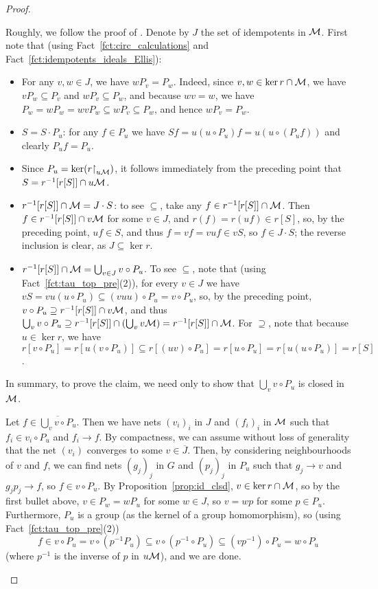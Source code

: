 \begin{proof}
		\begin{clmproof}
			Roughly, we follow the proof of \cite[Lemma 4.8]{KP17}. Denote by $J$ the set of idempotents in ${\mathcal M}$. First note that (using Fact~\ref{fct:circ_calculations} and Fact~\ref{fct:idempotents_ideals_Ellis}):
			\begin{itemize}
				\item
				For any $v,w\in J$, we have $wP_v=P_w$. Indeed, since $v,w\in \ker r\cap {\mathcal M}$, we have $vP_w\subseteq P_v$ and $wP_v\subseteq P_w$, and because $wv=w$, we have $P_w=wP_w=wvP_w\subseteq wP_v\subseteq P_w$, and hence $wP_v=P_w$.
				\item
				$S=S\cdot P_u$: for any $f\in P_u$ we have $Sf=u(u\circ P_u) f=u(u\circ (P_uf))$ and clearly $P_uf=P_u$.
				\item
				Since $P_u=\ker (r\mathord{\upharpoonright}_{u{\mathcal M}})$, it follows immediately from the preceding point that $S=r^{-1}[r[S]]\cap u{\mathcal M}$.
				\item
				$r^{-1}[r[S]]\cap {\mathcal M}=J\cdot S$: to see $\subseteq$, take any $f\in r^{-1}[r[S]]\cap {\mathcal M}$. Then $f\in r^{-1}[r[S]]\cap v{\mathcal M}$ for some $v\in J$, and $r(f)=r(uf)\in r[S]$, so, by the preceding point, $uf\in S$, and thus $f=vf=vuf\in vS$, so $f\in J\cdot S$; the reverse inclusion is clear, as $J\subseteq \ker r$.
				\item
				$r^{-1}[r[S]]\cap {\mathcal M}=\bigcup_{v\in J} v\circ P_u$. To see $\subseteq$, note that (using Fact~\ref{fct:tau_top_pre}(2)), for every $v\in J$ we have $vS=vu(u\circ P_u)\subseteq (vuu)\circ P_u=v\circ P_u$, so, by the preceding point, $v\circ P_u\supseteq r^{-1}[r[S]]\cap v{\mathcal M}$, and thus $\bigcup_v v\circ P_u\supseteq r^{-1}[r[S]]\cap (\bigcup_v v{\mathcal M})=r^{-1}[r[S]]\cap {\mathcal M}$. For $\supseteq$, note that because $u\in \ker r$, we have $r[v\circ P_u]=r[u(v\circ P_u)]\subseteq r[(uv)\circ P_u]=r[u\circ P_u]=r[u(u\circ P_u)]=r[S]$.
			\end{itemize}
			
			In summary, to prove the claim, we need only to show that ${\bigcup_v v\circ P_u}$ is closed in ${\mathcal M}$.
			
			Let $f\in \overline{\bigcup_v v\circ P_u}$. Then we have nets $(v_i)_i$ in $J$ and $(f_i)_i$ in ${\mathcal M}$ such that $f_i\in v_i\circ P_u$ and $f_i\to f$. By compactness, we can assume without loss of generality that the net $(v_i)$ converges to some $v\in \overline J$. Then, by considering neighbourhoods of $v$ and $f$, we can find nets $(g_j)_j$ in $G$ and $(p_j)_j$ in $P_u$ such that $g_j\to v$ and $g_jp_j\to f$, so $f\in v\circ P_u$. By Proposition~\ref{prop:id_clsd}, $v\in \ker r\cap {\mathcal M}$, so by the first bullet above, $v\in P_w=wP_u$ for some $w\in J$, so $v=wp$ for some $p\in P_u$. Furthermore, $P_u$ is a group (as the kernel of a group homomorphism), so (using Fact~\ref{fct:tau_top_pre}(2))
			\[
			f\in v\circ P_u=v\circ (p^{-1}P_u)\subseteq v\circ (p^{-1}\circ P_u)\subseteq (vp^{-1})\circ P_u=w\circ P_u
			\]
			(where $p^{-1}$ is the inverse of $p$ in $u{\mathcal M}$), and we are done.
		\end{clmproof}
	\end{proof}
	
